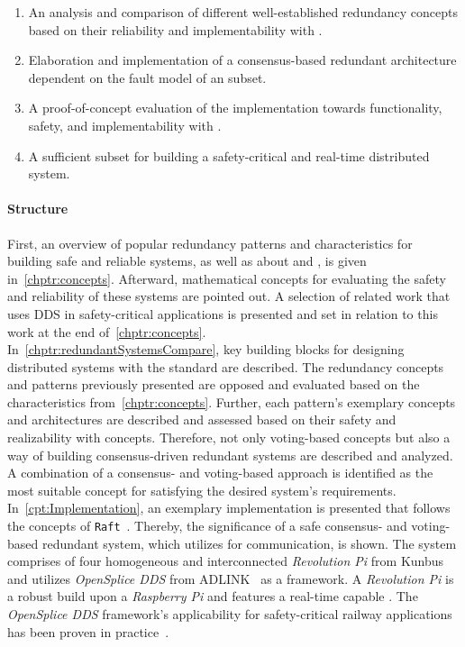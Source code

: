 \begin{enumerate}
\item An analysis and comparison of different well-established redundancy concepts based on their reliability and implementability with .
\item Elaboration and implementation of a consensus-based redundant architecture dependent on the fault model of an  subset.
\item A proof-of-concept evaluation of the implementation towards functionality, safety, and implementability with .
\item A sufficient  subset for building a safety-critical and real-time distributed system.
\end{enumerate}

\paragraph{Structure}
First, an overview of popular redundancy patterns and characteristics for building safe and reliable systems, as well as about  and , is given in~\autoref{chptr:concepts}.
Afterward, mathematical concepts for evaluating the safety and reliability of these systems are pointed out.
A selection of related work that uses \gls{DDS} in safety-critical applications is presented and set in relation to this work at the end of~\autoref{chptr:concepts}.
\\

In~\autoref{chptr:redundantSystemsCompare}, key building blocks for designing distributed systems with the  standard are described.
The redundancy concepts and patterns previously presented are opposed and evaluated based on the characteristics from~\autoref{chptr:concepts}.
Further, each pattern's exemplary concepts and architectures are described and assessed based on their safety and realizability with  concepts.
Therefore, not only voting-based concepts but also a way of building consensus-driven redundant systems are described and analyzed.
A combination of a consensus- and voting-based approach is identified as the most suitable concept for satisfying the desired system's requirements.
\\

In~\autoref{cpt:Implementation}, an exemplary implementation is presented that follows the concepts of \texttt{Raft}~\cite{RaftConsensusPaper}.
Thereby, the significance of a safe consensus- and voting-based redundant system, which utilizes  for communication, is shown.
The system comprises of four homogeneous and interconnected \textit{Revolution Pi} from Kunbus~\cite{Kunbus} and utilizes \textit{OpenSplice DDS} from ADLINK~\cite{VortexOpenSplice} as a  framework.
A \textit{Revolution Pi} is a robust  build upon a \textit{Raspberry Pi} and features a real-time capable .
The \textit{OpenSplice DDS} framework's applicability for safety-critical railway applications has been proven in practice~\cite{SchmidtMissionCriticalChallenges}.
\\


